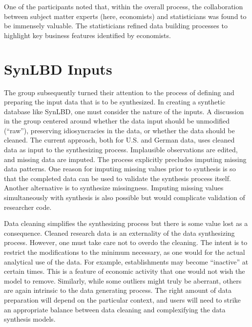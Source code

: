 \documentclass[letterpaper,12pt]{article}
\begin{document}
One of the participants noted that, within the overall process, the collaboration between subject matter experts (here, economists) and statisticians was found to be  immensely valuable. The statisticians refined data building processes to  highlight key business features identified by economists. 


\section{SynLBD Inputs}
The group subsequently turned their attention to the process of defining and preparing the input data that is to be synthesized. In creating a synthetic database like SynLBD, one must consider the nature of the inputs. A discussion in the group centered around whether the data input should be unmodified (``raw''), preserving idiosyncracies in the data,  or whether the data should be cleaned. The current approach, both for U.S. and German data, uses  cleaned data as input to the synthesizing process. Implausible observations are edited, and missing data are imputed.  The process explicitly precludes imputing missing data patterns. One reason for imputing missing values prior to synthesis is so that the completed data can be used to validate the synthesis process itself. Another alternative is to synthesize missingness.  Imputing missing values simultaneously with synthesis is also possible but would complicate validation of researcher code.

Data cleaning simplifies the synthesizing process but there is some value lost as a consequence. Cleaned research data is an externality of the data synthesizing  process. However, one must take care not to overdo the cleaning. The intent is to restrict the modifications to the minimum necessary, as one would for the actual analytical use of the data.  For example, establishments may become ``inactive'' at certain times. This is a feature of economic activity that one would not wish the model to remove. Similarly, while some outliers might truly be aberrant, others are again intrinsic to the data generating process. The right amount of data preparation will depend on the particular context, and users will need to strike an appropriate balance between data cleaning and complexifying the data synthesis models.
\end{document}
